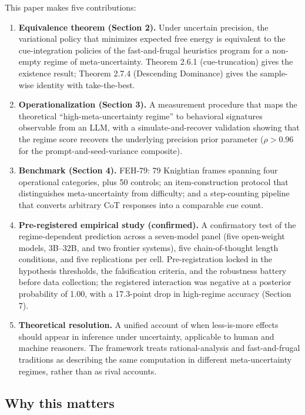 \documentclass{article}
\begin{document}
This paper makes five contributions:

\begin{enumerate}
\def\labelenumi{\arabic{enumi}.}
\item
  \textbf{Equivalence theorem (Section 2).} Under uncertain precision,
  the variational policy that minimizes expected free energy is
  equivalent to the cue-integration policies of the fast-and-frugal
  heuristics program for a non-empty regime of meta-uncertainty. Theorem
  2.6.1 (cue-truncation) gives the existence result; Theorem 2.7.4
  (Descending Dominance) gives the sample-wise identity with
  take-the-best.
\item
  \textbf{Operationalization (Section 3).} A measurement procedure that
  maps the theoretical ``high-meta-uncertainty regime'' to behavioral
  signatures observable from an LLM, with a simulate-and-recover
  validation showing that the regime score recovers the underlying
  precision prior parameter (\(\rho > 0.96\) for the
  prompt-and-seed-variance composite).
\item
  \textbf{Benchmark (Section 4).} FEH-79: 79 Knightian frames spanning
  four operational categories, plus 50 controls; an item-construction
  protocol that distinguishes meta-uncertainty from difficulty; and a
  step-counting pipeline that converts arbitrary CoT responses into a
  comparable cue count.
\item
  \textbf{Pre-registered empirical study (confirmed).} A confirmatory
  test of the regime-dependent prediction across a seven-model panel
  (five open-weight models, 3B--32B, and two frontier systems), five
  chain-of-thought length conditions, and five replications per cell.
  Pre-registration locked in the hypothesis thresholds, the
  falsification criteria, and the robustness battery before data
  collection; the registered interaction was negative at a posterior
  probability of 1.00, with a 17.3-point drop in high-regime accuracy
  (Section 7).
\item
  \textbf{Theoretical resolution.} A unified account of when
  less-is-more effects should appear in inference under uncertainty,
  applicable to human and machine reasoners. The framework treats
  rational-analysis and fast-and-frugal traditions as describing the
  same computation in different meta-uncertainty regimes, rather than as
  rival accounts.
\end{enumerate}

\subsection{Why this matters}\label{why-this-matters}
\end{document}
